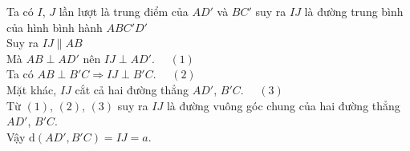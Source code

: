 \begin{ex}
{\begin{itemchoice}
		Ta có $I$, $J$  lần lượt là trung điểm của $AD'$ và $BC'$ suy ra $IJ$ là đường trung bình của hình bình hành $ABC'D'$\\
		Suy ra $IJ\parallel AB$\\ 
		Mà $AB\perp AD'$ nên  $IJ\perp AD'$. $\quad (1)$\\
		Ta có $AB\perp B'C\Rightarrow IJ\perp  B'C$. $\quad (2)$\\
		Mặt khác, $IJ$ cắt cả hai đường  thẳng $AD'$, $B'C$. $\quad (3)$\\
		Từ $(1)$, $(2)$, $(3)$  suy ra $IJ$ là đường vuông góc chung của hai đường thẳng $AD'$, $B'C$.\\
		 Vậy $\mathrm{d}(AD',B'C)=IJ=a$.
\end{itemchoice}}
\end{ex}

